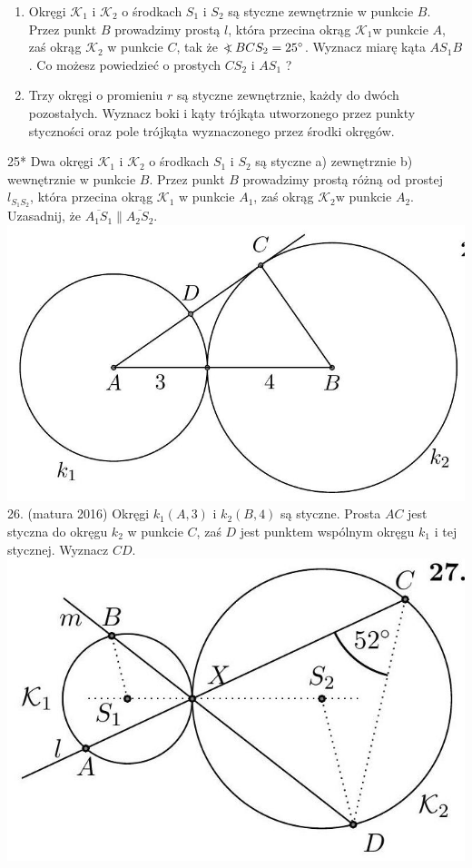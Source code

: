 \documentclass[10pt]{article}
\newcommand\Varangle{\mathop{{<\!\!\!\!\!\text{\small)}}\:}\nolimits}
\begin{document}
\begin{enumerate}
  \item Okręgi \(\mathcal{K}_{1}\) i \(\mathcal{K}_{2}\) o środkach \(S_{1}\) i \(S_{2}\) są styczne zewnętrznie w punkcie \(B\). Przez punkt \(B\) prowadzimy prostą \(l\), która przecina okrąg \(\mathcal{K}_{1} \mathrm{w}\) punkcie \(A\), zaś okrąg \(\mathcal{K}_{2}\) w punkcie \(C\), tak że \(\Varangle B C S_{2}=25^{\circ}\). Wyznacz miarę kąta \(A S_{1} B\). Co możesz powiedzieć o prostych \(C S_{2}\) i \(A S_{1}\) ?
  \item Trzy okręgi o promieniu \(r\) są styczne zewnętrznie, każdy do dwóch pozostałych. Wyznacz boki i kąty trójkąta utworzonego przez punkty styczności oraz pole trójkąta wyznaczonego przez środki okręgów.
\end{enumerate}

25* Dwa okręgi \(\mathcal{K}_{1}\) i \(\mathcal{K}_{2}\) o środkach \(S_{1}\) i \(S_{2}\) są styczne a) zewnętrznie b) wewnętrznie w punkcie \(B\). Przez punkt \(B\) prowadzimy prostą różną od prostej \(l_{S_{1} S_{2}}\), która przecina okrąg \(\mathcal{K}_{1}\) w punkcie \(A_{1}\), zaś okrąg \(\mathcal{K}_{2} \mathrm{w}\) punkcie \(A_{2}\). Uzasadnij, że \(\overline{A_{1} S_{1}} \| \overline{A_{2} S_{2}}\).\\
\includegraphics[max width=\textwidth, center]{2024_11_21_e9b4faa005d5be2cc318g-036}\\
26. (matura 2016) Okręgi \(k_{1}(A, 3)\) i \(k_{2}(B, 4)\) są styczne. Prosta \(A C\) jest styczna do okręgu \(k_{2}\) w punkcie \(C\), zaś \(D\) jest punktem wspólnym okręgu \(k_{1}\) i tej stycznej. Wyznacz \(C D\).\\
\includegraphics[max width=\textwidth, center]{2024_11_21_e9b4faa005d5be2cc318g-037}\\
\end{document}

